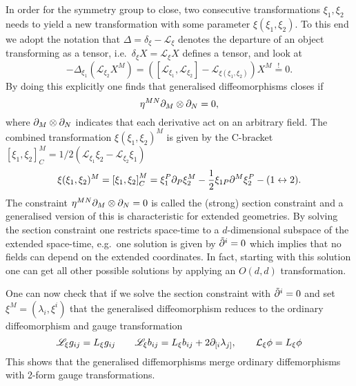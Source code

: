 In order for the symmetry group to close, two consecutive transformations $\xi_1,\xi_2$ needs to yield a new transformation with some parameter $\xi(\xi_1,\xi_2)$. To this end we adopt the notation that $\Delta=\delta_\xi-\mathscr{L}_\xi$ denotes the departure of an object transforming as a tensor, i.e.\ $\delta_\xi X = \mathscr{L}_\xi X$ defines a tensor, and look at 
\begin{equation}
    -\Delta_{\xi_1}(\mathscr{L}_{\xi_2} X^M) = \left(\left[\mathscr{L}_{\xi_1},\mathscr{L}_{\xi_2}\right]-\mathscr{L}_{\xi(\xi_1,\xi_2)}\right)X^M \overset{!}{=} 0.
\end{equation}
By doing this explicitly one finds that generalised diffeomorphisms closes if 
\begin{equation}
    \eta^{MN}\partial_M\otimes\partial_N = 0,
\end{equation}
where $\partial_M \otimes \partial_N$ indicates that each derivative act on an arbitrary field. The combined transformation $\xi(\xi_1,\xi_2)^M$ is given by the C-bracket $\left[\xi_1,\xi_2\right]_C^M = 1/2(\mathcal{L}_{\xi_1}\xi_2-\mathcal{L}_{\xi_2}\xi_1)$
\begin{equation}
    \xi(\xi_1,\xi_2)^M = \left[\xi_1,\xi_2\right]_C^M = \xi_1^P\partial_P\xi_2^M-\frac{1}{2}\xi_{1P}\partial^M\xi^P_2-(1\leftrightarrow 2).
\end{equation}
The constraint $\eta^{MN}\partial_M\otimes\partial_N=0$ is called the (strong) section constraint and a generalised version of this is characteristic for extended geometries. By solving the section constraint one restricts space-time to a $d$-dimensional subspace of the extended space-time, e.g.\ one solution is given by $\tilde{\partial}^i=0$ which implies that no fields can depend on the extended coordinates. In fact, starting with this solution one can get all other possible solutions by applying an $O(d,d)$ transformation. 

One can now check that if we solve the section constraint with $\tilde{\partial}^i=0$ and set $\xi^M = (\lambda_i,\xi^i)$ that the generalised diffeomorphism reduces to the ordinary diffeomorphism and gauge transformation 
\begin{equation}
    \mathscr{L}_\xi g_{ij} = L_\xi g_{ij} \qquad \mathscr{L}_\xi b_{ij} = L_\xi b_{ij}+2\partial_{[i}\lambda_{j]}, \qquad \mathcal{L}_\xi \phi = L_\xi\phi
\end{equation}
This shows that the generalised diffemorphisms merge ordinary diffemorphisms with 2-form gauge transformations. 





